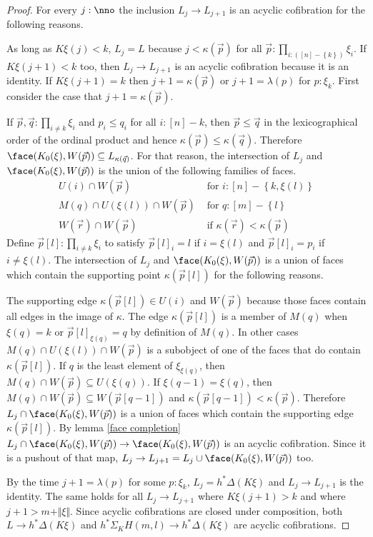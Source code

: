 \documentclass{tac}
\newcommand\set[1]{\left\{#1\right\}}
\newcommand\ri{^*}
\newcommand\of{:}
\newcommand\simplex\Delta
\newcommand\norm[1]{\Vert #1 \Vert}
\newcommand\ka\kappa
\newcommand\la\lambda
\newcommand\depsum{\Sigma_}
\newcommand\U{U}
\newcommand\A{M}
\newcommand\W{W}
\begin{document}
\begin{proof}
For every $j\of\nno$ the inclusion $L_j\to L_{j+1}$ is an acyclic cofibration for the following reasons.

As long as $K\xi(j)<k$, $L_j = L$ because $j<\kappa(\vec p)$ for all $\vec p \of\prod_{i\of([n]-\set k)}\xi_i$. If $K\xi(j+1)<k$ too, then $L_j\to L_{j+1}$ is an acyclic cofibration because it is an identity. If $K\xi(j+1) = k$ then $j+1=\kappa(\vec p)$ or $j+1 = \la(p)$ for $p\of\xi_k$. First consider the case that $j+1=\ka(\vec p)$. 

If $\vec p,\vec q\of\prod_{i\neq k} \xi_i$ and $p_i\leq q_i$ for all $i\of[n]-k$, then $\vec p \leq \vec q$ in the lexicographical order of the ordinal product and hence $\ka(\vec p)\leq \ka(\vec q)$. Therefore $\face(K_0(\xi),\W(\vec p))\subseteq L_{\ka(\vec q)}$. For that reason, the intersection of $L_j$ and $\face(K_0(\xi),\W(\vec p))$ is the union of the following families of faces.
\begin{align*}
\U(i)\cap \W(\vec p) &\textrm{ for $i\of[n]-\set{k,\xi(l)}$}\\
\A(q)\cap\U(\xi(l))\cap \W(\vec p) &\textrm{ for $q\of[m]-\set l$}\\
\W(\vec r)\cap \W(\vec p) &\textrm{ if $\kappa(\vec r)<\kappa(\vec p)$ }
\end{align*}
Define $\vec p[l]\of\prod_{i\neq k} \xi_i$ to satisfy $\vec p[l]_i = l$ if $i=\xi(l)$ and $\vec p[l]_i = p_i$ if $i\neq \xi(l)$. The intersection of $L_j$ and $\face(K_0(\xi),\W(\vec p))$ is a union of faces which contain the supporting point $\kappa(\vec p[l])$ for the following reasons. 

The supporting edge $\kappa(\vec p[l])\in\U(i)$ and $\W(\vec p)$ because those faces contain all edges in the image of $\ka$. The edge $\kappa(\vec p[l])$ is a member of $\A(q)$ when $\xi(q)=k$ or $\vec p[l]_{\xi(q)}=q$ by definition of $M(q)$. In other cases $\A(q)\cap\U(\xi(l))\cap \W(\vec p)$ is a subobject of one of the faces that do contain $\kappa(\vec p[l])$. If $q$ is the least element of $\xi_{\xi(q)}$, then $\A(q)\cap\W(\vec p)\subseteq \U(\xi(q))$. If $\xi(q-1)=\xi(q)$, then $\A(q)\cap \W(\vec p) \subseteq \W(\vec p[q-1])$ and $\kappa(\vec p[q-1])<\kappa(\vec p)$. Therefore $L_j\cap \face(K_0(\xi),\W(\vec p))$ is a union of faces which contain the supporting edge $\ka(\vec p[l])$. By lemma \ref{face completion} $L_j\cap \face(K_0(\xi),\W(\vec p))\to \face(K_0(\xi),\W(\vec p))$ is an acyclic cofibration. Since it is a pushout of that map, $L_j\to L_{j+1} = L_j\cup \face(K_0(\xi),\W(\vec p))$ too.

By the time $j+1 = \la(p)$ for some $p\of \xi_k$, $L_j = h\ri \simplex(K\xi)$ and $L_j\to L_{j+1}$ is the identity. The same holds for all $L_j\to L_{j+1}$ where $K\xi(j+1)>k$ and where $j+1>m+\norm\xi$. Since acyclic cofibrations are closed under composition, both $L\to h\ri \simplex(K\xi)$ and $h\ri \depsum K H(m,l) \to h\ri \simplex(K\xi)$ are acyclic cofibrations.
\end{proof}
\end{document}
